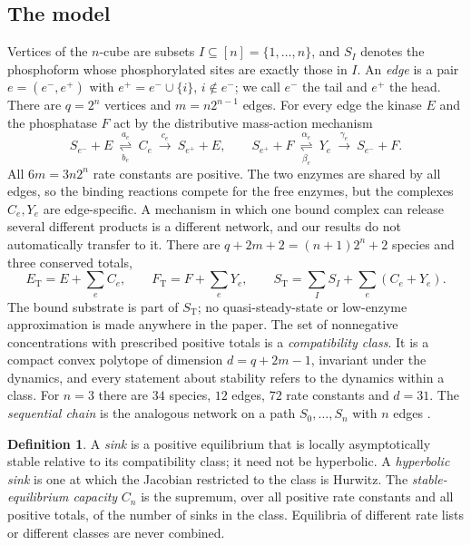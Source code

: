 \documentclass[11pt]{article}
\theoremstyle{plain}
\theoremstyle{definition}
\newtheorem{definition}[theorem]{Definition}
\theoremstyle{remark}
\numberwithin{equation}{section}
\newcommand{\ET}{E_{\mathrm T}}
\newcommand{\FT}{F_{\mathrm T}}
\newcommand{\ST}{S_{\mathrm T}}
\newcommand{\tl}[1]{#1^{-}}
\newcommand{\hd}[1]{#1^{+}}
\begin{document}
\subsection{The model}
Vertices of the \(n\)-cube are subsets \(I\subseteq[n]=\{1,\dots,n\}\), and \(S_I\) denotes
the phosphoform whose phosphorylated sites are exactly those in \(I\). An \emph{edge} is a
pair \(e=(\tl e,\hd e)\) with \(\hd e=\tl e\cup\{i\}\), \(i\notin\tl e\); we call \(\tl e\) the
tail and \(\hd e\) the head. There are \(q=2^n\) vertices and \(m=n2^{n-1}\) edges. For every
edge the kinase \(E\) and the phosphatase \(F\) act by the distributive mass-action mechanism
\begin{equation}\label{eq:source}
 S_{\tl e}+E\ \underset{b_e}{\overset{a_e}{\rightleftharpoons}}\ C_e
       \ \xrightarrow{\ c_e\ }\ S_{\hd e}+E,
 \qquad
 S_{\hd e}+F\ \underset{\beta_e}{\overset{\alpha_e}{\rightleftharpoons}}\ Y_e
       \ \xrightarrow{\ \gamma_e\ }\ S_{\tl e}+F .
\end{equation}
All \(6m=3n2^n\) rate constants are positive. The two enzymes are shared by all edges, so the
binding reactions compete for the free enzymes, but the complexes \(C_e,Y_e\) are
edge-specific. A mechanism in which one bound complex can release several different products
is a different network, and our results do not automatically transfer to it. There are
\(q+2m+2=(n+1)2^n+2\) species and three conserved totals,
\begin{equation}\label{eq:totals}
 \ET=E+\sum_e C_e,\qquad \FT=F+\sum_eY_e,\qquad
 \ST=\sum_I S_I+\sum_e(C_e+Y_e).
\end{equation}
The bound substrate is part of \(\ST\); no quasi-steady-state or low-enzyme approximation is
made anywhere in the paper. The set of nonnegative concentrations with prescribed positive
totals is a \emph{compatibility class}. It is a compact convex polytope of dimension
\(d=q+2m-1\), invariant under the dynamics, and every statement about stability refers to the
dynamics within a class. For \(n=3\) there are \(34\) species, \(12\) edges, \(72\) rate
constants and \(d=31\). The \emph{sequential chain} is the analogous network on a path
\(S_0,\dots,S_n\) with \(n\) edges \cite{WangSontag2008,Companion}.

\begin{definition}\label{def:capacity}
A \emph{sink} is a positive equilibrium that is locally asymptotically stable relative to its
compatibility class; it need not be hyperbolic. A \emph{hyperbolic sink} is one at which the
Jacobian restricted to the class is Hurwitz. The \emph{stable-equilibrium capacity} \(C_n\) is
the supremum, over all positive rate constants and all positive totals, of the number of sinks
in the class. Equilibria of different rate lists or different classes are never combined.
\end{definition}
\end{document}
